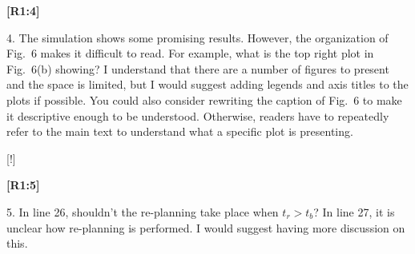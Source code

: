 \documentclass[10pt]{letter}
\begin{document}
{\hspace*{-4.5em}\textbf{[R1:4]}\vspace*{-1.9em}}


4. The simulation shows some promising results. However, the organization of Fig.~6 makes it difficult to read. For example, what is the top right plot in Fig.~6(b) showing? I understand that there are a number of figures to present and the space is limited, but I would suggest adding legends and axis titles to the plots if possible. You could also consider rewriting the caption of Fig.~6 to make it descriptive enough to be understood. Otherwise, readers have to repeatedly refer to the main text to understand what a specific plot is presenting.

{\color{blue} 

{\hspace*{-4.5em}{[R1:4]}\vspace*{-1.9em}}

[!]}

{\hspace*{-4.5em}\textbf{[R1:5]}\vspace*{-1.9em}}

5. In line 26, shouldn’t the re-planning take place when $t_r>t_b$? In line 27, it is unclear how
re-planning is performed. I would suggest having more discussion on this.

{\hspace*{-4.5em}{[R1:5]}\vspace*{-1.9em}}
\end{document}
